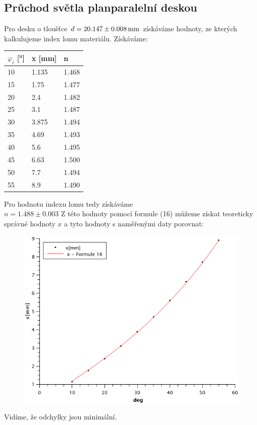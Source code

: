\documentclass[czech,11pt,a4paper]{article}
\begin{document}
\begin{multicols}{2}
		\subsection{Průchod světla planparalelní deskou}
		Pro desku o tloušťce $d = 20.147 \pm 0.008 \,\rm mm$ získáváme hodnoty, ze kterých kalkulujeme index lomu materiálu. Získáváme:
		\begin{center}
			\begin{tabular}{|l|l|l|}
			\hline
			$\varphi _i$ [°] & x [mm] & n                \\ \hline
			10               & 1.135  & 1.468 \\ \hline
			15               & 1.75   & 1.477 \\ \hline
			20               & 2.4    & 1.482 \\ \hline
			25               & 3.1    & 1.487  \\ \hline
			30               & 3.875  & 1.494 \\ \hline
			35               & 4.69   & 1.493 \\ \hline
			40               & 5.6    & 1.495 \\ \hline
			45               & 6.63   & 1.500 \\ \hline
			50               & 7.7    & 1.494 \\ \hline
			55               & 8.9    & 1.490 \\ \hline
		\end{tabular}
		\end{center}
		Pro hodnotu indexu lomu tedy získáváme\\ $n = 1.488 \pm 0.003$
		Z této hodnoty pomocí formule (16) můžeme získat teoreticky správné hodnoty $x$ a tyto hodnoty s naměřenými daty porovnat:
		\begin{figure}[H]
			\includegraphics[width = 0.9\linewidth, center]{Srovnani2}
		\end{figure}
		Vidíme, že odchylky jsou minimální.
		

\end{multicols}
\end{document}
